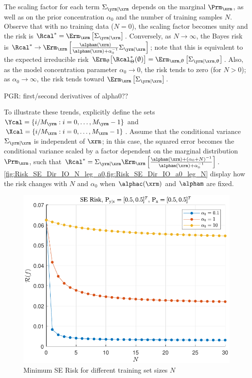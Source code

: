 \documentclass[12pt]{report}
\begin{document}
The scaling factor for each term $\Sigma_{\yrm | \xrm}$ depends on the marginal $\Prm_{\xrm}$, as well as on the prior concentration $\alpha_0$ and the number of training samples $N$. Observe that with no training data ($N = 0$), the scaling factor becomes unity and the risk is $\Rcal^* = \Erm_{\xrm} \left[ \Sigma_{\yrm | \xrm} \right]$. Conversely, as $N \to \infty$, the Bayes risk is $\Rcal^* \to \Erm_{\xrm} \left[ \frac{\alpham(\xrm)}{\alpham(\xrm) + \alpha_0^{-1}} \Sigma_{\yrm | \xrm} \right]$; note that this is equivalent to the expected irreducible risk  $\Erm_{\uptheta}\big[\Rcal_{\Theta}^*(\uptheta)\big] = \Erm_{\xrm,\uptheta} \left[ \Sigma_{\yrm | \xrm,\uptheta} \right]$. Also, as the model concentration parameter $\alpha_0 \to 0$, the risk tends to zero (for $N > 0$); as $\alpha_0 \to \infty$, the risk tends toward $\Erm_{\xrm} \left[ \Sigma_{\yrm | \xrm} \right]$.

PGR: first/second derivatives of alpha0??

To illustrate these trends, explicitly define the sets $\Ycal = \{ i/M_{\yrm} : i = 0,\ldots,M_{\yrm}-1 \}$ and $\Xcal = \{ i/M_{\xrm} : i = 0,\ldots,M_{\xrm}-1 \}$. Assume that the conditional variance $\Sigma_{\yrm | \xrm}$ is independent of $\xrm$; in this case, the squared error becomes the conditional variance scaled by a factor dependent on the marginal distribution $\Prm_{\xrm}$, such that $\Rcal^* = \Sigma_{\yrm | \xrm} \Erm_{\xrm} \left[ \frac{\alpham(\xrm) + (\alpha_0+N)^{-1}}{\alpham(\xrm) + \alpha_0^{-1}} \right]$. \cref{fig:Risk_SE_Dir_IO_N_leg_a0,fig:Risk_SE_Dir_IO_a0_leg_N} display how the risk changes with $N$ and $\alpha_0$ when $\alphac(\xrm)$ and $\alpham$ are fixed.

\begin{figure}
\centering
\includegraphics[width=0.7\linewidth]{Risk_SE_Dir_IO_N_leg_a0.pdf}
\caption{Minimum SE Risk for different training set sizes $N$}
\label{fig:Risk_SE_Dir_IO_N_leg_a0}
\end{figure}
\end{document}

